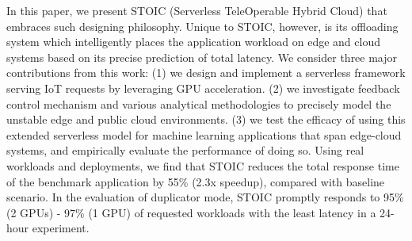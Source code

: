 In this paper, we present STOIC (Serverless TeleOperable Hybrid Cloud) that embraces such designing philosophy. Unique to STOIC, however, is its offloading system which intelligently places the application workload on edge and cloud systems based on its precise prediction of total latency. We consider three major contributions from this work: (1) we design and implement a serverless framework serving IoT requests by leveraging GPU acceleration. (2) we investigate feedback control mechanism and various analytical methodologies to precisely model the unstable edge and public cloud environments. (3) we test the efficacy of using this extended serverless model for machine learning applications that span edge-cloud systems, and empirically evaluate the performance of doing so. Using real workloads and deployments, we find that STOIC reduces the total response time of the benchmark application by 55\% (2.3x speedup), compared with baseline scenario. In the evaluation of duplicator mode, STOIC promptly responds to 95\% (2 GPUs) - 97\% (1 GPU) of requested workloads with the least latency in a 24-hour experiment. 
\fi


